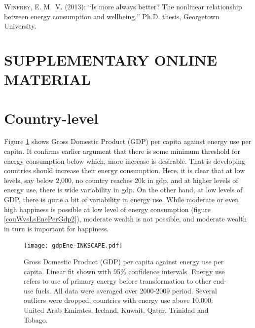 \documentclass[10pt, letterpaper]{article}
\begin{document}
\begin{spacing}{1.5}
\begin{thebibliography}{52}
\textsc{Winfrey, E. M.~V.} (2013): \enquote{Is more always better? The
  nonlinear relationship between energy consumption and wellbeing,} Ph.D.
  thesis, Georgetown University.

\end{thebibliography}




\newpage
\section*{\huge SUPPLEMENTARY ONLINE MATERIAL}

\tableofcontents
\setcounter{figure}{0}    
\setcounter{table}{0}    

\renewcommand{\thetable}{S\arabic{table}}
\renewcommand{\thefigure}{S\arabic{figure}}

\section{Country-level}



Figure \ref{gdpEne} shows Gross Domestic Product (GDP) per capita against energy use per
capita. It confirms earlier argument that there is some minimum threshold for
energy consumption below which, more increase is desirable. That is developing
countries should increase their energy consumption. Here, it is clear that at
low levels, say below 2,000, no country reaches 20k in gdp, and at higher levels
of energy use, there is wide variability in gdp. On the other hand, at low
levels of GDP, there is quite a bit of variability in energy use. While
moderate or even high happiness is possible at low level of energy consumption (figure
\ref{couWvsLsEnePerGdp2}), moderate wealth is not possible, and moderate wealth
in turn is important for happiness. 

\begin{figure}[H]
 \texttt{[image: gdpEne-INKSCAPE.pdf]}\centering \caption{Gross Domestic
   Product (GDP) per capita against energy use per capita.
Linear fit shown with 95\%  confidence intervals. Energy use
   refers to use of primary energy before transformation to other end-use
   fuels. All data were averaged over 2000-2009 period.  %
 Several outliers were dropped: countries with energy use above 10,000: United Arab Emirates, Iceland, Kuwait, Qatar, Trinidad and Tobago.}\label{gdpEne} 
\end{figure}


\end{spacing}
\end{document}
